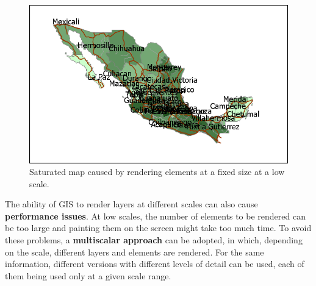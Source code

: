 \begin{figure}[!hbt]
\centering
\includegraphics[width=.9\columnwidth]{Visualization/SaturatedMap.png}
\caption{\small Saturated map caused by rendering elements at a fixed size at a low scale.}
\label{Fig:SaturatedMap} 
\end{figure}

The ability of GIS to render layers at different scales can also cause \textbf{performance issues}. At low scales, the number of elements to be rendered can be too large and painting them on the screen might take too much time. To avoid these problems, a \textbf{multiscalar approach} can be adopted, in which, depending on the scale, different layers and elements are rendered. For the same information, different versions with different levels of detail can be used, each of them being used only at a given scale range.

\pagestyle{empty}